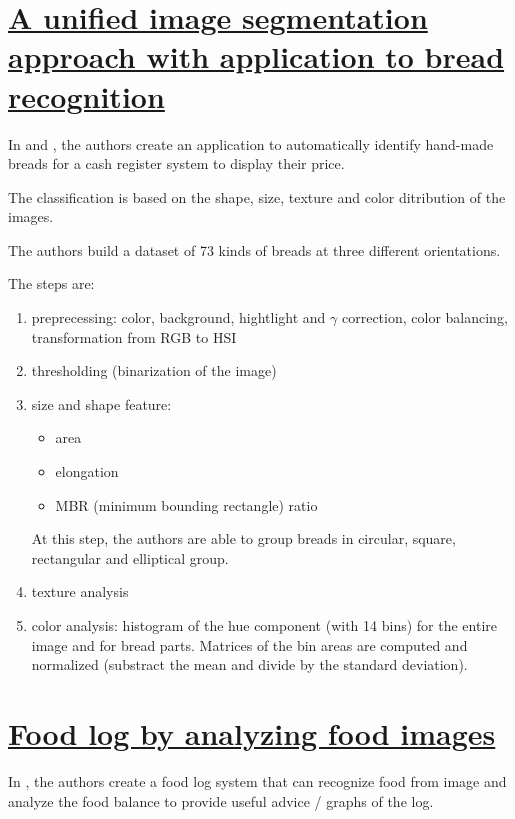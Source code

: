 \section{\href{http://ieeexplore.ieee.org/lpdocs/epic03/wrapper.htm?arnumber=891642}{A unified image segmentation approach with application to bread recognition}}

In \cite{Pishva2000} and \cite{Pishva2000a}, the authors create an application to automatically identify hand-made breads for a cash register system to display their price.

The classification is based on the shape, size, texture and color ditribution of the images.

The authors build a dataset of 73 kinds of breads at three different orientations.

The steps are:
\begin{enumerate}
    \item preprecessing: color, background, hightlight and $\gamma$ correction, color balancing, transformation from RGB to HSI
    \item thresholding (binarization of the image)
    \item size and shape feature:
    \begin{itemize}
        \item area
        \item elongation
        \item MBR (minimum bounding rectangle) ratio
    \end{itemize}
    At this step, the authors are able to group breads in circular, square, rectangular and elliptical group.
    \item texture analysis
    \item color analysis: histogram of the hue component (with 14 bins) for the entire image and for  bread parts. Matrices of the bin areas are computed and normalized (substract the mean and divide by the standard deviation).
\end{enumerate}

\section{\href{http://portal.acm.org/citation.cfm?doid=1459359.1459548}{Food log by analyzing food images}}

In \cite{Kitamura2008}, the authors create a food log system that can recognize food from image and analyze the food balance to provide useful advice / graphs of the log.

